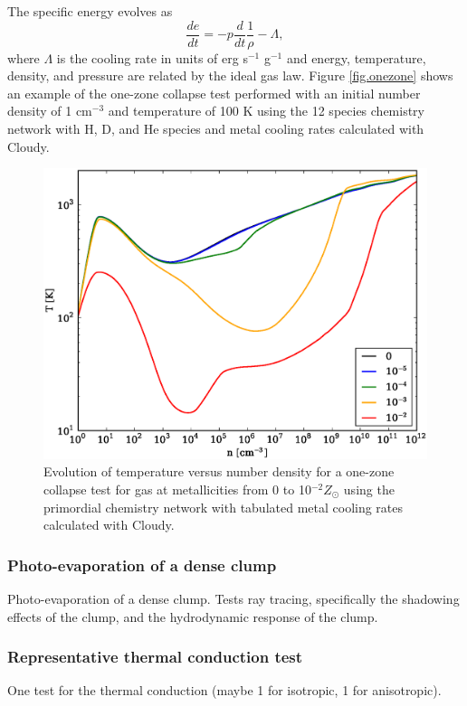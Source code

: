 The specific energy evolves as
\begin{equation}
\frac{de}{dt} = -p \frac{d}{dt} \frac{1}{\rho} - \Lambda,
\end{equation}
where $\Lambda$ is the cooling rate in units of erg s$^{-1}$ g$^{-1}$
and energy, temperature, density, and pressure are related by the
ideal gas law.  Figure \ref{fig.onezone} shows an example of the
one-zone collapse test performed with an initial number density of 1
cm$^{-3}$ and temperature of 100 K using the 12 species chemistry
network with H, D, and He species and metal cooling rates calculated
with Cloudy.

\begin{figure} \label{fig.onezone}
  \begin{center}
    \includegraphics[width=1.0\textwidth]{figures/OneZoneCollapseTest.eps}
    \caption{Evolution of temperature versus number density for a one-zone
      collapse test for gas at metallicities from 0 to 10$^{-2} Z_{\odot}$
      using the primordial chemistry network with tabulated metal cooling
      rates calculated with Cloudy.}
    \label{fig.1zone}
  \end{center}
\end{figure}


\subsubsection{Photo-evaporation of a dense clump}
\label{sec.tests.raytracing}
Photo-evaporation of a dense clump.  Tests ray tracing, specifically
the shadowing effects of the clump, and the hydrodynamic response of
the clump.





\subsubsection{Representative thermal conduction test}
\label{sec.tests.conduct}
One test for the thermal conduction (maybe 1 for isotropic, 1 for
anisotropic).
